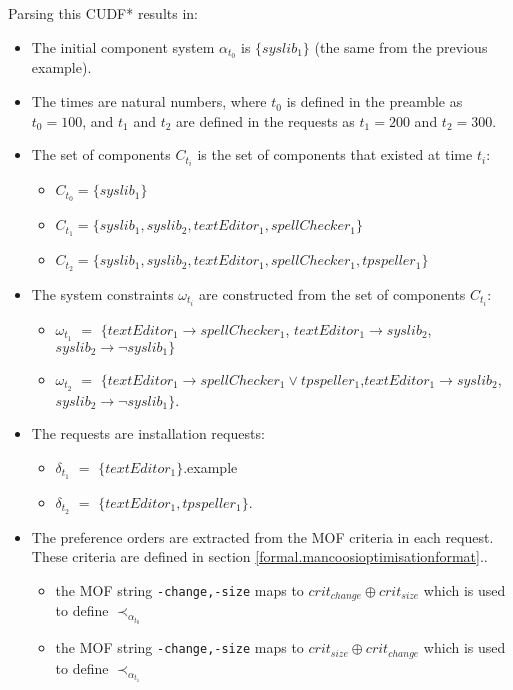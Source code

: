 Parsing this CUDF* results in:
\begin{itemize}
  \item The initial component system $\alpha_{t_0}$ is $\{syslib_1\}$ (the same from the previous example).
  \item The times are natural numbers, where $t_0$ is defined in the preamble as $t_0 = 100$, and $t_1$ and $t_2$ are defined in the requests as $t_1 = 200$ and $t_2 = 300$.
  \item The set of components $C_{t_i}$ is the set of components that existed at time $t_i$:
\begin{itemize}
  \item $C_{t_0} = \{syslib_1\}$
  \item $C_{t_1} = \{syslib_1, syslib_2, textEditor_1, spellChecker_1\}$
  \item $C_{t_2} = \{syslib_1, syslib_2, textEditor_1, spellChecker_1, tpspeller_1\}$
\end{itemize} 

\item The system constraints $\omega_{t_i}$ are constructed from the set of components $C_{t_i}$:
\begin{itemize}
  \item $\omega_{t_1}$ $=$ $\{ textEditor_1 \rightarrow spellChecker_1$, $textEditor_1 \rightarrow syslib_2$,  $syslib_2 \rightarrow \neg syslib_1\}$
  \item $\omega_{t_2}$ $=$ $\{textEditor_1 \rightarrow spellChecker_1 \vee tpspeller_1$,$textEditor_1 \rightarrow syslib_2$, $syslib_2 \rightarrow \neg syslib_1\}$.
\end{itemize}

\item The requests are installation requests:
\begin{itemize}
  \item $\delta_{t_1}$ $=$  $\{textEditor_1\}$.example
  \item $\delta_{t_2}$ $=$ $\{textEditor_1, tpspeller_1\}$.
\end{itemize}
\item The preference orders are extracted from the MOF criteria in each request.
These criteria are defined in section \ref{formal.mancoosioptimisationformat}..  
\begin{itemize}
  \item the MOF string \texttt{-change,-size} maps to  $crit_{change} \oplus crit_{size}$ which is used to define $\prec_{\alpha_{t_0}}$
  \item the MOF string \texttt{-change,-size} maps to  $crit_{size} \oplus crit_{change}$ which is used to define $\prec_{\alpha_{t_1}}$
\end{itemize}
\end{itemize}

